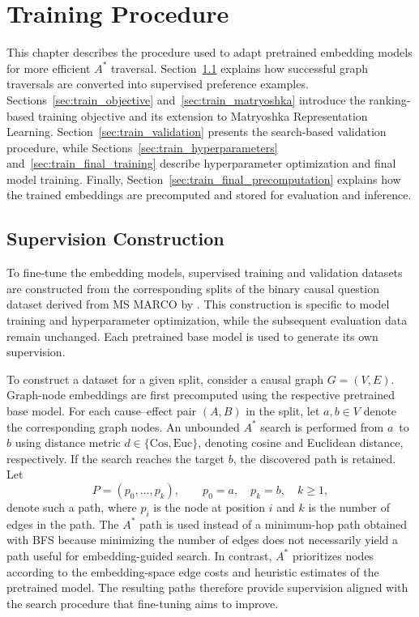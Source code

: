 \chapter{Training Procedure}
\label{chap:train}

This chapter describes the procedure used to adapt pretrained embedding models for more efficient $A^*$ traversal. Section~\ref{sec:train_dataset} explains how successful graph traversals are converted into supervised preference examples. Sections~\ref{sec:train_objective} and~\ref{sec:train_matryoshka} introduce the ranking-based training objective and its extension to Matryoshka Representation Learning. Section~\ref{sec:train_validation} presents the search-based validation procedure, while Sections~\ref{sec:train_hyperparameters} and~\ref{sec:train_final_training} describe hyperparameter optimization and final model training. Finally, Section~\ref{sec:train_final_precomputation} explains how the trained embeddings are precomputed and stored for evaluation and inference.

\section{Supervision Construction}
\label{sec:train_dataset}

To fine-tune the embedding models, supervised training and validation datasets are constructed from the corresponding splits of the binary causal question dataset derived from MS MARCO by \citet{bluebaum:2024}. This construction is specific to model training and hyperparameter optimization, while the subsequent evaluation data remain unchanged. Each pretrained base model is used to generate its own supervision.

To construct a dataset for a given split, consider a causal graph $G=(V,E)$. Graph-node embeddings are first precomputed using the respective pretrained base model. For each cause--effect pair $(A,B)$ in the split, let $a,b\in V$ denote the corresponding graph nodes. An unbounded $A^*$ search is performed from \mbox{$a$ to $b$} using distance metric $d\in\{\mathrm{Cos},\mathrm{Euc}\}$, denoting cosine and Euclidean distance, respectively. If the search reaches the target $b$, the discovered path is retained. Let
\[
P=(p_0,\dots,p_k), \qquad p_0=a,\quad p_k=b,\quad k\geq1,
\]
denote such a path, where $p_i$ is the node at position $i$ and $k$ is the number of edges in the path. The $A^*$ path is used instead of a minimum-hop path obtained with BFS because minimizing the number of edges does not necessarily yield a path useful for embedding-guided search. In contrast, $A^*$ prioritizes nodes according to the embedding-space edge costs and heuristic estimates of the pretrained model. The resulting paths therefore provide supervision aligned with the search procedure that fine-tuning aims to improve.

